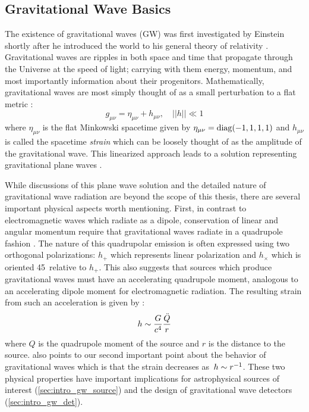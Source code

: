 \subsection{Gravitational Wave Basics}
\label{sec:intro_gw_basics}
The existence of gravitational waves (GW) was first investigated by Einstein shortly after he introduced the world to his general theory of relativity \citep[GR;][]{Einstein1915,Einstein1916,Einstein1918}. Gravitational waves are ripples in both space and time that propagate through the Universe at the speed of light; carrying with them energy, momentum, and most importantly information about their progenitors. Mathematically, gravitational waves are most simply thought of as a small perturbation to a flat metric \citep[$g_{\mu\nu}$; ][]{Misner+73,Carroll2004}:
\begin{equation}
\label{eq:intro_metric}
g_{\mu\nu} = \eta_{\mu\nu} + h_{\mu\nu}, \quad ||h|| \ll 1
\end{equation}
\noindent where $\eta_{\mu\nu}$ is the flat Minkowski spacetime given by $\eta_{\mu\nu} = {\rm diag}(-1,1,1,1)$ and $h_{\mu\nu}$ is called the spacetime {\em strain} which can be loosely thought of as the amplitude of the gravitational wave. This linearized approach leads to a solution representing gravitational plane waves \citep[see e.g.,][and references therein]{Misner+73,Carroll2004}.

While discussions of this plane wave solution and the detailed nature of gravitational wave radiation are beyond the scope of this thesis, there are several important physical aspects worth mentioning. First, in contrast to electromagnetic waves which radiate as a dipole, conservation of linear and angular momentum require that gravitational waves radiate in a quadrupole fashion \citep[see e.g.,][and references therein]{Centrella+10}. The nature of this quadrupolar emission is often expressed using two orthogonal polarizations: $h_{+}$ which represents linear polarization and $h_{\times}$ which is oriented 45\degr~relative to $h_{+}$. This also suggests that sources which produce gravitational waves must have an accelerating quadrupole moment, analogous to an accelerating dipole moment for electromagnetic radiation. The resulting strain from such an acceleration is given by \citep{Centrella+10}:
\begin{equation}
\label{eq:intro_quad}
h \apx \frac{G}{c^4} \frac{\ddot{Q}}{r}
\end{equation}
\noindent where $Q$ is the quadrupole moment of the source and $r$ is the distance to the source.  also points to our second important point about the behavior of gravitational waves which is that the strain decreases as~$h \sim r^{-1}$. These two physical properties have important implications for astrophysical sources of interest (\cref{sec:intro_gw_source}) and the design of gravitational wave detectors (\cref{sec:intro_gw_det}).

